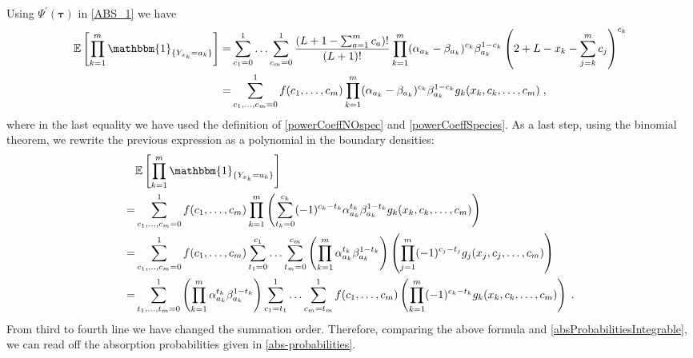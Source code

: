 \documentclass[10pt]{article}
\numberwithin{equation}{section}
\numberwithin{equation}{subsection}
\newcommand{\co}{\;,}
\newcommand{\dt}{\;.}
\begin{document}
Using $\Psi^{'}(\bm{\tau})$ in \eqref{ABS_1} we have 
\begin{align}
	\mathbb{E}\left[\prod_{k=1}^{m}\mathbbm{1}_{\{Y_{x_{k}}=a_{k}\}}\right]=&\sum_{c_{1}=0}^{1}\ldots\sum_{c_{m}=0}^{1}\frac{(L+1-\sum_{a=1}^{m}c_{a})!}{(L+1)!}\prod_{k=1}^{m}(\alpha_{a_{k}}-\beta_{a_{k}})^{c_{k}}\beta_{a_{k}}^{1-c_{k}}\left(2+L-x_{k}-\sum_{j=k}^{m}c_{j}\right)^{c_{k}}\nonumber\\
	=&\sum_{c_{1},\ldots,c_{m}=0}^{1}
	f(c_{1},\ldots,c_{m})\prod_{k=1}^{m}(\alpha_{a_{k}}-\beta_{a_{k}})^{c_{k}}\beta_{a_{k}}^{1-c_{k}}g_{k}(x_{k},c_{k},\ldots,c_{m})\co
\end{align}
where in the last equality we have used the definition of \eqref{powerCoeffNOspec} and \eqref{powerCoeffSpecies}.
As a last step, using the binomial theorem, we rewrite the previous expression as a polynomial in the boundary densities: 
\begin{align}
	&\mathbb{E}\left[\prod_{k=1}^{m}\mathbbm{1}_{\{Y_{x_{k}}=a_{k}\}}\right]\nonumber\\=&
	\sum_{c_{1},\ldots,c_{m}=0}^{1}
	f(c_{1},\ldots,c_{m})\prod_{k=1}^{m}\left(\sum_{t_{k}=0}^{c_{k}}(-1)^{c_{k}-t_{k}}\alpha_{a_{k}}^{t_{k}}\beta_{a_{k}}^{1-t_{k}}g_{k}(x_{k},c_{k},\ldots,c_{m})\right)\nonumber\\
	=&\sum_{c_{1},\ldots,c_{m}=0}^{1}
	f(c_{1},\ldots,c_{m})\sum_{t_{1}=0}^{c_{1}}\ldots\sum_{t_{m}=0}^{c_{m}}\left(\prod_{k=1}^{m}\alpha_{a_{k}}^{t_{k}}\beta_{a_{k}}^{1-t_{k}}\right)\left(\prod_{j=1}^{m}(-1)^{c_{j}-t_{j}}g_{j}(x_{j},c_{j},\ldots,c_{m})\right)\nonumber\\
	=&\sum_{t_{1},\ldots,t_{m}=0}^{1}\left(\prod_{k=1}^{m}\alpha_{a_{k}}^{t_{k}}\beta_{a_{k}}^{1-t_{k}}\right)\sum_{c_{1}=t_{1}}^{1}\ldots\sum_{c_{m}=t_{m}}^{1}f(c_{1},\ldots,c_{m})\left(\prod_{k=1}^{m}(-1)^{c_{k}-t_{k}}g_{k}(x_{k},c_{k},\ldots,c_{m})\right)\dt
\end{align}
From third to fourth line we have changed the summation order. Therefore, comparing the above formula and \eqref{absProbabilitiesIntegrable}, we can read off the absorption probabilities given in \eqref{abs-probabilities}.
\end{document}
